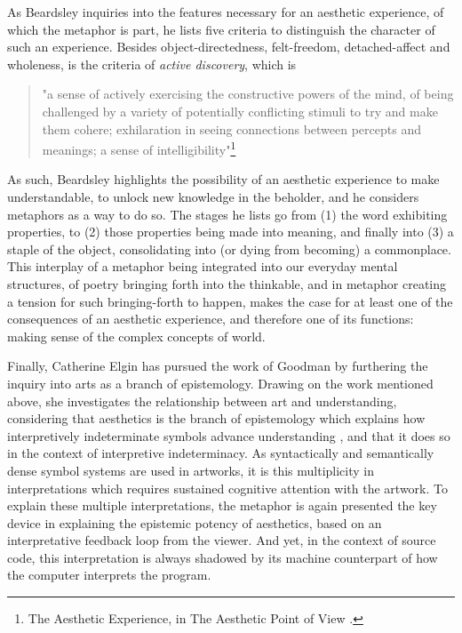 As Beardsley inquiries into the features necessary for an aesthetic experience, of which the metaphor is part, he lists five criteria to distinguish the character of such an experience. Besides object-directedness, felt-freedom, detached-affect and wholeness, is the criteria of \emph{active discovery}, which is

\begin{quote}
    "a sense of actively exercising the constructive powers of the mind, of being challenged by a variety of potentially conflicting stimuli to try and make them cohere; exhilaration in seeing connections between percepts and meanings; a sense of intelligibility"\footnote{The Aesthetic Experience, in The Aesthetic Point of View \citep{beardsley_aesthetic_1970}.}
\end{quote}

As such, Beardsley highlights the possibility of an aesthetic experience to make understandable, to unlock new knowledge in the beholder, and he considers metaphors as a way to do so. The stages he lists go from (1) the word exhibiting properties, to (2) those properties being made into meaning, and finally into (3) a staple of the object, consolidating into (or dying from becoming) a commonplace. This interplay of a metaphor being integrated into our everyday mental structures, of poetry bringing forth into the thinkable, and in metaphor creating a tension for such bringing-forth to happen, makes the case for at least one of the consequences of an aesthetic experience, and therefore one of its functions: making sense of the complex concepts of world.

Finally, Catherine Elgin has pursued the work of Goodman by furthering the inquiry into arts as a branch of epistemology. Drawing on the work mentioned above, she investigates the relationship between art and understanding, considering that aesthetics is the branch of epistemology which explains how interpretively indeterminate symbols advance understanding \citep{elgin_understanding_2020}, and that it does so in the context of interpretive indeterminacy. As syntactically and semantically dense symbol systems are used in artworks,  it is this multiplicity in interpretations which requires sustained cognitive attention with the artwork. To explain these multiple interpretations, the metaphor is again presented the key device in explaining the epistemic potency of aesthetics, based on an interpretative feedback loop from the viewer. And yet, in the context of source code, this interpretation is always shadowed by its machine counterpart of how the computer interprets the program.

